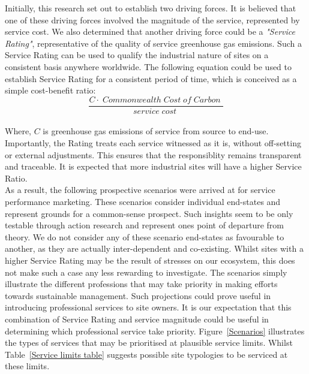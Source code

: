 \documentclass[12pt, oneside]{article}   	%
\begin{document}
Initially, this research set out to establish two driving forces.
It is believed that one of these driving forces involved the magnitude of the service, represented by service cost.
We also determined that another driving force could be a \emph{"Service Rating"}, representative of the quality of service greenhouse gas emissions.
Such a Service Rating can be used to qualify the industrial nature of sites on a consistent basis anywhere worldwide.
The following equation could be used to establish Service Rating for a consistent period of time, which is conceived as a simple cost-benefit ratio:\\

\begin{equation}
	\frac{C  \cdot \;Commonwealth\; Cost\; of\; Carbon\;}{service\; cost\;}
\end{equation}\\

Where, $C$ is greenhouse gas emissions of service from source to end-use.
Importantly, the Rating treats each service witnessed as it is, without off-setting or external adjustments.
This ensures that the responsiblity remains transparent and traceable.
It is expected that more industrial sites will have a higher Service Ratio.\\

As a result, the following prospective scenarios were arrived at for service performance marketing.
These scenarios consider individual end-states and represent grounds for a common-sense prospect.
Such insights seem to be only testable through action research and represent ones point of departure from theory.
We do not consider any of these scenario end-states as favourable to another, as they are actually inter-dependent and co-existing.
Whilst sites with a higher Service Rating may be the result of stresses on our ecosystem, this does not make such a case any less rewarding to investigate.
The scenarios simply illustrate the different professions that may take priority in making efforts towards sustainable management.
Such projections could prove useful in introducing professional services to site owners.
It is our expectation that this combination of Service Rating and service magnitude could be useful in determining which professional service take priority.
Figure~\ref{Scenarios} illustrates the types of services that may be prioritised at plausible service limits.
Whilst Table~\ref{Service limits table} suggests possible site typologies to be serviced at these limits.\\
\end{document}
